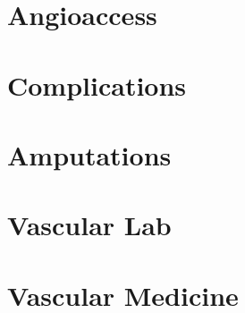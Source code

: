 \documentclass[
]{book}
\begin{document}
\hypertarget{angioaccess}{%
\chapter{Angioaccess}\label{angioaccess}}

\hypertarget{section-7}{%
\section{}\label{section-7}}

\hypertarget{complications}{%
\chapter{Complications}\label{complications}}

\hypertarget{section-8}{%
\section{}\label{section-8}}

\hypertarget{amputations}{%
\chapter{Amputations}\label{amputations}}

\hypertarget{section-9}{%
\section{}\label{section-9}}

\hypertarget{vascular-lab}{%
\chapter{Vascular Lab}\label{vascular-lab}}

\hypertarget{section-10}{%
\section{}\label{section-10}}

\hypertarget{vascular-medicine}{%
\chapter{Vascular Medicine}\label{vascular-medicine}}

\hypertarget{section-11}{%
\section{}\label{section-11}}
\end{document}
